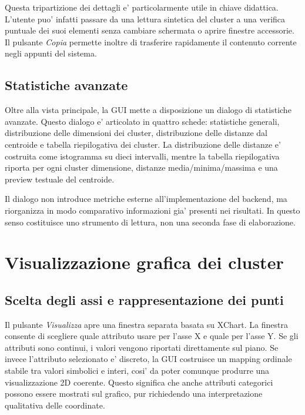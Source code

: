 Questa tripartizione dei dettagli e' particolarmente utile in chiave didattica. L'utente
puo' infatti passare da una lettura sintetica del cluster a una verifica puntuale dei
suoi elementi senza cambiare schermata o aprire finestre accessorie. Il pulsante
\emph{Copia} permette inoltre di trasferire rapidamente il contenuto corrente negli
appunti del sistema.

\subsection{Statistiche avanzate}

Oltre alla vista principale, la GUI mette a disposizione un dialogo di statistiche
avanzate. Questo dialogo e' articolato in quattro schede: statistiche generali,
distribuzione delle dimensioni dei cluster, distribuzione delle distanze dal centroide e
tabella riepilogativa dei cluster. La distribuzione delle distanze e' costruita come
istogramma su dieci intervalli, mentre la tabella riepilogativa riporta per ogni cluster
dimensione, distanze media/minima/massima e una preview testuale del centroide.

Il dialogo non introduce metriche esterne all'implementazione del backend, ma riorganizza
in modo comparativo informazioni gia' presenti nei risultati. In questo senso costituisce
uno strumento di lettura, non una seconda fase di elaborazione.

\section{Visualizzazione grafica dei cluster}

\subsection{Scelta degli assi e rappresentazione dei punti}

Il pulsante \emph{Visualizza} apre una finestra separata basata su XChart. La finestra
consente di scegliere quale attributo usare per l'asse X e quale per l'asse Y. Se gli
attributi sono continui, i valori vengono riportati direttamente sul piano. Se invece
l'attributo selezionato e' discreto, la GUI costruisce un mapping ordinale stabile tra
valori simbolici e interi, cosi' da poter comunque produrre una visualizzazione 2D
coerente. Questo significa che anche attributi categorici possono essere mostrati sul
grafico, pur richiedendo una interpretazione qualitativa delle coordinate.

